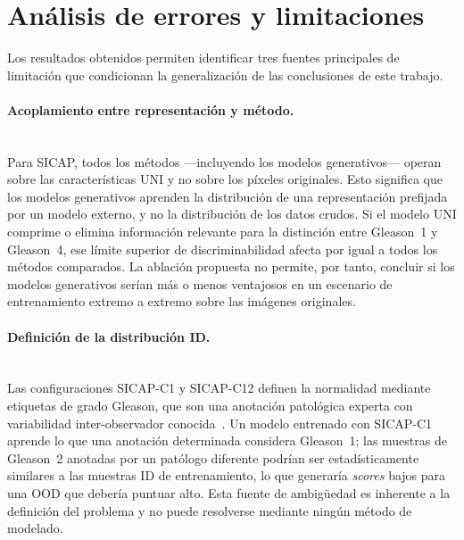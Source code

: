 \begin{table}[htbp]
    \centering
    \caption{Ablación del número de pasos de puntuación~$T$ del DDPM en
             SICAP-C1 y SICAP-C12. Se reporta el AUROC medio para cada
             combinación de \textit{score} y~$T$. Un valor pequeño de~$T$
             reduce el coste computacional con pérdida marginal de rendimiento.}
    \label{tab:ablation_t}
    
\end{table}

\section{Análisis de errores y limitaciones}
\label{sec:res-limitaciones}

Los resultados obtenidos permiten identificar tres fuentes principales de limitación
que condicionan la generalización de las conclusiones de este trabajo.

\paragraph{Acoplamiento entre representación y método.}~\\
Para SICAP, todos los métodos —incluyendo los modelos generativos— operan sobre
las características UNI y no sobre los píxeles originales. Esto significa que los
modelos generativos aprenden la distribución de una representación prefijada por un
modelo externo, y no la distribución de los datos crudos. Si el modelo UNI comprime
o elimina información relevante para la distinción entre Gleason~1 y Gleason~4,
ese límite superior de discriminabilidad afecta por igual a todos los métodos
comparados. La ablación propuesta no permite, por tanto, concluir si los modelos
generativos serían más o menos ventajosos en un escenario de entrenamiento
extremo a extremo sobre las imágenes originales.

\paragraph{Definición de la distribución ID.}~\\
Las configuraciones SICAP-C1 y SICAP-C12 definen la normalidad mediante etiquetas
de grado Gleason, que son una anotación patológica experta con variabilidad
inter-observador conocida~\cite{allsbrook_interobserver_2001}. Un modelo entrenado
con SICAP-C1 aprende lo que una anotación determinada considera Gleason~1; las
muestras de Gleason~2 anotadas por un patólogo diferente podrían ser
estadísticamente similares a las muestras ID de entrenamiento, lo que generaría
\textit{scores} bajos para una OOD que debería puntuar alto. Esta fuente de
ambigüedad es inherente a la definición del problema y no puede resolverse mediante
ningún método de modelado.

